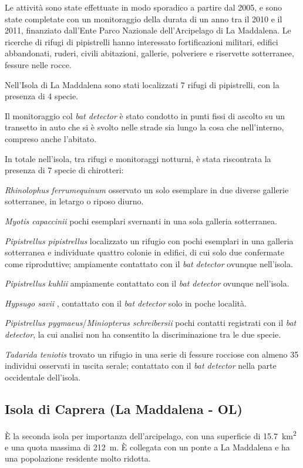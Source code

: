 \begin{multicols}{2}
Le attività sono state effettuate in modo sporadico a partire dal 2005, e sono state completate con un monitoraggio della durata di un anno tra il 2010 e il 2011, finanziato dall’Ente Parco Nazionale dell’Arcipelago di La Maddalena. Le ricerche di rifugi di pipistrelli hanno interessato fortificazioni militari, edifici abbandonati, ruderi, civili abitazioni, gallerie, polveriere e riservette sotterranee, fessure nelle rocce.

Nell'Isola di La Maddalena sono stati localizzati 7 rifugi di pipistrelli, con la presenza di 4 specie.

Il monitoraggio col \textit{bat detector} è stato condotto in punti fissi di ascolto su un transetto in auto che si è svolto nelle strade sia lungo la cosa che nell’interno, compreso anche l'abitato.

In totale nell’isola, tra rifugi e monitoraggi notturni, è stata riscontrata la presenza di 7 specie di chirotteri:
\begin{compactdesc}
\item[\emph{Rhinolophus ferrumequinum}] osservato un solo esemplare in due diverse gallerie sotterranee, in letargo o riposo diurno.
\item[\emph{Myotis capaccinii}] pochi esemplari svernanti in una sola galleria sotterranea.
\item[\emph{Pipistrellus pipistrellus}] localizzato un rifugio con pochi esemplari in una galleria sotterranea e individuate quattro colonie in edifici, di cui solo due confermate come riproduttive; ampiamente contattato con il \textit{bat detector} ovunque nell’isola.
\item[\emph{Pipistrellus kuhlii}] ampiamente contattato con il \textit{bat detector} ovunque nell’isola.
\item[\emph{Hypsugo savii}], contattato con il \textit{bat detector} solo in poche località.
\item[\emph{Pipistrellus pygmaeus}/\emph{Miniopterus schreibersii}] pochi contatti registrati con il \textit{bat detector}, la cui analisi non ha consentito la discriminazione tra le due specie.
\item[\emph{Tadarida teniotis}] trovato un rifugio in una serie di fessure rocciose con almeno 35 individui osservati in uscita serale; contattato con il \textit{bat detector} nella parte occidentale dell’isola.
\end{compactdesc}

\subsection*{Isola di Caprera (La Maddalena - OL)}
È la seconda isola per importanza dell’arcipelago, con una superficie di \SI{15.7}{\square\kilo\meter} e una quota massima di 212~m. È collegata con un ponte a La Maddalena e ha una popolazione residente molto ridotta. 


\end{multicols}
